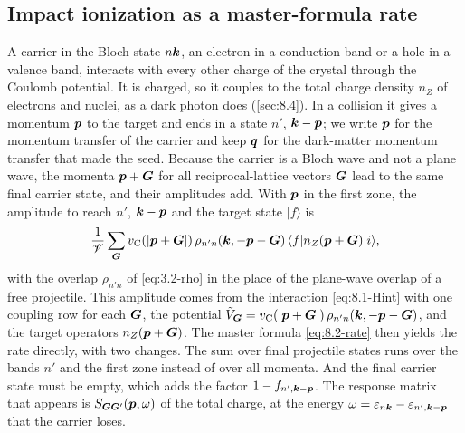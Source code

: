 \subsection{Impact ionization as a master-formula rate}\label{sec:18.1-ii}

A carrier in the Bloch state $n\bm{k}$, an electron in a conduction band or a hole in a valence band, interacts with every other charge of the crystal through the Coulomb potential. It is charged, so it couples to the total charge density $n_Z$ of electrons and nuclei, as a dark photon does (\cref{sec:8.4}). In a collision it gives a momentum $\bm{p}$ to the target and ends in a state $n'$, $\bm{k} - \bm{p}$; we write $\bm{p}$ for the momentum transfer of the carrier and keep $\bm{q}$ for the dark-matter momentum transfer that made the seed. Because the carrier is a Bloch wave and not a plane wave, the momenta $\bm{p} + \bm{G}$ for all reciprocal-lattice vectors $\bm{G}$ lead to the same final carrier state, and their amplitudes add. With $\bm{p}$ in the first zone, the amplitude to reach $n'$, $\bm{k} - \bm{p}$ and the target state $|f\rangle$ is
\begin{equation*}
  \frac{1}{\mathscr{V}}\sum_{\bm{G}}v_{\mathrm{C}}(|\bm{p}+\bm{G}|)\,\rho_{n'n}(\bm{k},-\bm{p}-\bm{G})\,\langle f|n_Z(\bm{p}+\bm{G})|i\rangle ,
\end{equation*}
with the overlap $\rho_{n'n}$ of \cref{eq:3.2-rho} in the place of the plane-wave overlap of a free projectile. This amplitude comes from the interaction \cref{eq:8.1-Hint} with one coupling row for each $\bm{G}$, the potential $\tilde V_{\bm{G}} = v_{\mathrm{C}}(|\bm{p}+\bm{G}|)\,\rho_{n'n}(\bm{k},-\bm{p}-\bm{G})$, and the target operators $n_Z(\bm{p}+\bm{G})$. The master formula \cref{eq:8.2-rate} then yields the rate directly, with two changes. The sum over final projectile states runs over the bands $n'$ and the first zone instead of over all momenta. And the final carrier state must be empty, which adds the factor $1 - f_{n',\bm{k}-\bm{p}}$. The response matrix that appears is $S_{\bm{G}\bm{G}'}(\bm{p},\omega)$ of the total charge, at the energy $\omega = \varepsilon_{n\bm{k}} - \varepsilon_{n',\bm{k}-\bm{p}}$ that the carrier loses.

